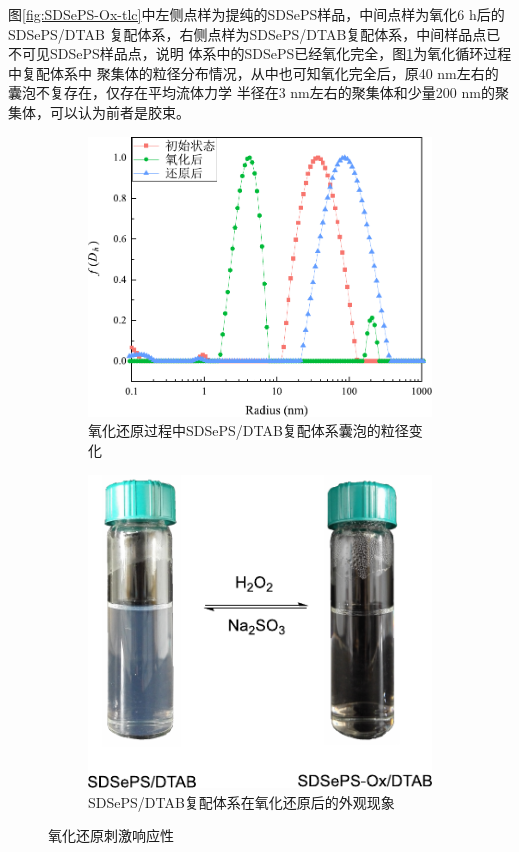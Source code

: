 \documentclass[bachelor,fandolfonts,replaceperiod]{jnuthesis}
\begin{document}
    图\ref{fig:SDSePS-Ox-tlc}中左侧点样为提纯的SDSePS样品，中间点样为氧化6 h后的SDSePS/DTAB
    复配体系，右侧点样为SDSePS/DTAB复配体系，中间样品点已不可见SDSePS样品点，说明
    体系中的SDSePS已经氧化完全，图\ref{fig:SDSePS-redox-radius}为氧化循环过程中复配体系中
    聚集体的粒径分布情况，从中也可知氧化完全后，原40 nm左右的囊泡不复存在，仅存在平均流体力学
    半径在3 nm左右的聚集体和少量200 nm的聚集体，可以认为前者是胶束。
    
    \begin{figure}[htbp]
        \begin{subfigure}[]{.5\textwidth}
            \centering
            \includegraphics[width=.98\textwidth]{figure/SDSePS-redox-radius.pdf}
            \caption{氧化还原过程中SDSePS/DTAB复配体系囊泡的粒径变化}\label{fig:SDSePS-redox-radius}
        \end{subfigure}%
        \begin{subfigure}[]{.5\textwidth}
            \centering
            \includegraphics[width=.8\textwidth]{figure/scheme-SDSePS-redox.pdf}
            \caption{SDSePS/DTAB复配体系在氧化还原后的外观现象}\label{fig:scheme-SDSePS-redox}
        \end{subfigure}%
        \caption{氧化还原刺激响应性}
        \label{fig:氧化还原刺激响应性}
    \end{figure}
    
\end{document}

